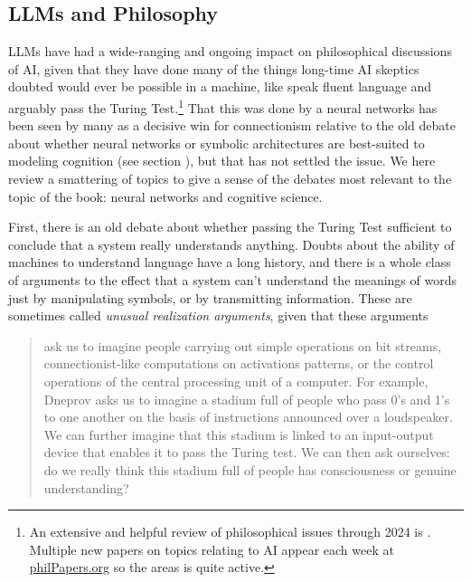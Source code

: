 \subsection{LLMs and Philosophy}\label{llmPhilosophy}

LLMs have had a wide-ranging and ongoing impact on philosophical discussions of
AI, given that they have done many of the things long-time AI skeptics doubted
would ever be possible in a machine, like speak fluent language and arguably
pass the Turing Test.\footnote{An extensive and helpful review of philosophical
issues through 2024 is \cite{milliere2024philosophical1,
milliere2024philosophical2}. Multiple new papers on topics relating to AI
appear each week at \url{philPapers.org} so the areas is quite active.} That
this was done by a neural networks has been seen by many as a decisive win for
connectionism relative to the old debate about whether neural networks or
symbolic architectures are best-suited to modeling cognition (see section
), but that has not settled the issue. We here review  a
smattering of topics to give a sense of the debates most relevant to the topic
of the book: neural networks and cognitive science.  


First, there is an old debate about whether passing the Turing Test sufficient
to conclude that a system really understands anything. Doubts about the ability
of machines to understand language have a long history, and there is a whole
class of arguments to the effect that a system can't understand the meanings of
words just by manipulating symbols, or by transmitting information. These are
sometimes called \emph{unusual realization arguments}, given that these
arguments
\begin{quote}
ask us to imagine people carrying out simple operations on bit streams,
connectionist-like computations on activations patterns, or the control
operations of the central processing unit of a computer. For example, Dneprov
asks us to imagine a stadium full of people who pass 0's and 1's to one another
on the basis of instructions announced over a loudspeaker. We can further
imagine that this stadium is linked to an input-output device that enables it
to pass the Turing test. We can then ask ourselves: do we really think this
stadium full of people has consciousness or genuine understanding?
\cite{noelle2022artificial}
\end{quote}


